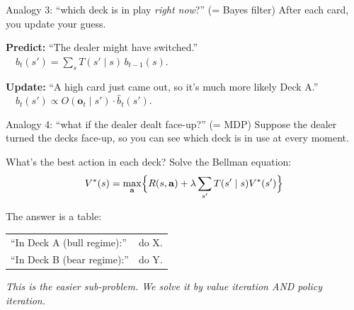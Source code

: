 \documentclass[11pt,aspectratio=169]{beamer}
\begin{document}
\begin{frame}{Analogy 3: ``which deck is in play \emph{right now}?'' (= Bayes filter)}
After each card, you update your guess.
\bigskip

\textbf{Predict:} ``The dealer might have switched.''\\[2pt]
$\quad\hat b_t(s') = \sum_s T(s'\mid s)\,b_{t-1}(s).$

\medskip
\textbf{Update:} ``A high card just came out, so it's much more likely Deck A.''\\[2pt]
$\quad b_t(s') \propto O(\mathbf{o}_t\mid s')\cdot\hat b_t(s').$

\bigskip
{}
\end{frame}

\begin{frame}{Analogy 4: ``what if the dealer dealt face-up?'' (= MDP)}
Suppose the dealer turned the decks face-up, so you can see which deck is in use at every moment.

\bigskip
What's the best action in each deck? Solve the Bellman equation:
\[
V^\ast(s) = \max_{\mathbf{a}}\Bigl\{R(s,\mathbf{a}) + \lambda\sum_{s'} T(s'\mid s)V^\ast(s')\Bigr\}
\]

\bigskip
The answer is a table:
\begin{center}\small
\begin{tabular}{ll}
``In Deck A (bull regime):'' & do X. \\
``In Deck B (bear regime):'' & do Y. \\
\end{tabular}
\end{center}

\bigskip
\centering\textit{This is the easier sub-problem. We solve it by value iteration AND policy iteration.}
\end{frame}
\end{document}
